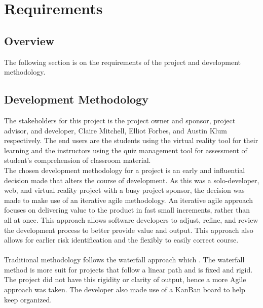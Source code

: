 \section{Requirements}
\label{sec:Requirements}

\subsection{Overview} 
The following section is on the requirements of the project and development methodology. 

\subsection{Development Methodology}
The stakeholders for this project is the project owner and sponsor, project advisor, and developer, Claire Mitchell, Elliot Forbes, and Austin Klum respectively. The end users are the students using the virtual reality tool for their learning and the instructors using the quiz management tool for assessment of student's comprehension of classroom material.
\\
The chosen development methodology for a project is an early and influential decision made that alters the course of development. As this was a solo-developer, web, and virtual reality project with a busy project sponsor, the decision was made to make use of an iterative agile methodology. An iterative agile approach focuses on delivering value to the product in fast small increments, rather than all at once. This approach allows software developers to adjust, refine, and review the development process to better provide value and output. This approach also allows for earlier risk identification and the flexibly to easily correct course.\\
\\
Traditional methodology follows the waterfall approach which . The waterfall method is more suit for projects that follow a linear path and is fixed and rigid. The project did not have this rigidity or clarity of output, hence a more Agile approach was taken. The developer also made use of a KanBan board to help keep organized. 


